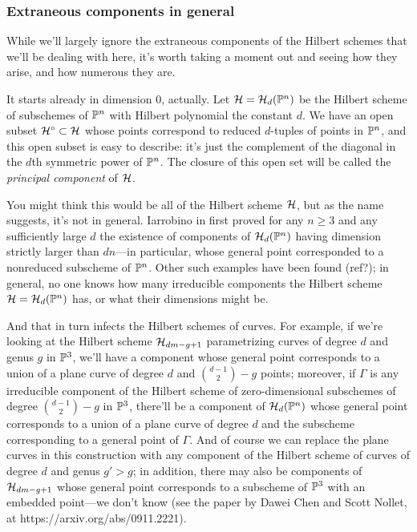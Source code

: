 \subsubsection{Extraneous components in general}

While we'll largely ignore the extraneous components of the Hilbert schemes that we'll be dealing with here, it's worth taking a moment out and seeing how they arise, and how numerous they are.

It starts already in dimension 0, actually. Let $\cH = \cH_d(\PP^n)$ be the Hilbert scheme of subschemes of $\PP^n$ with Hilbert polynomial the constant $d$. We have an open subset $\cH^\circ \subset \cH$ whose points correspond to reduced $d$-tuples of points in $\PP^n$, and this open subset is easy to describe: it's just the complement of the diagonal in the $d$th symmetric power of $\PP^n$. The closure of this open set will be called the \emph{principal component} of $\cH$.

You might think this would be all of the Hilbert scheme $\cH$, but as the name suggests, it's not in general. Iarrobino in \cite{Iarrobino} first proved  for any $n \geq 3$ and any sufficiently large $d$ the existence of components of $\cH_d(\PP^n)$ having dimension strictly larger than $dn$---in particular, whose general point corresponded to a nonreduced subscheme of $\PP^n$. Other such examples have been found (ref?); in general, no one knows how many irreducible components the Hilbert scheme $\cH = \cH_d(\PP^n)$ has, or what their dimensions might be.

And that in turn infects the Hilbert schemes of curves. For example, if we're looking at the Hilbert scheme $\cH_{dm-g+1}$ parametrizing curves of degree $d$ and genus $g$ in $\PP^3$, we'll have a component whose general point corresponds to a union of a plane curve of degree $d$ and $\binom{d-1}{2} - g$ points; moreover, if $\Gamma$ is any irreducible component of the Hilbert scheme of zero-dimensional subschemes of degree $\binom{d-1}{2} - g$ in $\PP^3$, there'll be a component of $\cH_d(\PP^n)$ whose  general point corresponds to a union of a plane curve of degree $d$ and the subscheme corresponding to a general point of $\Gamma$. And of course we can replace the plane curves in this construction with any component of the Hilbert scheme of curves of degree $d$ and genus $g' > g$; in addition, there may also be components of $\cH_{dm-g+1}$ whose general point corresponds to a subscheme of $\PP^3$ with an embedded point---we don't know (see the paper by Dawei Chen and Scott Nollet, at https://arxiv.org/abs/0911.2221).


